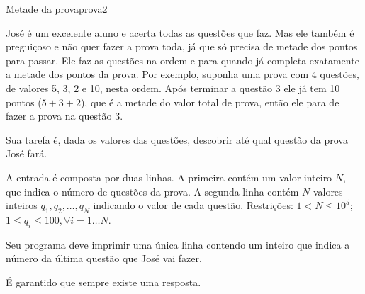 \documentclass[12pt,a4paper,oneside]{article}
\begin{document}
\begin{problem}{Metade da prova}{prova}{2}

José é um excelente aluno e acerta todas as questões que faz. Mas ele também é preguiçoso e não quer fazer a prova toda, já que só precisa de metade dos pontos para passar. Ele faz as questões na ordem e para quando já completa exatamente a metade dos pontos da prova. Por exemplo, suponha uma prova com 4 questões, de valores 5, 3, 2 e 10, nesta ordem. Após terminar a questão 3 ele já tem 10 pontos ($5+3+2$), que é a metade do valor total de prova, então ele para de fazer a prova na questão 3.

Sua tarefa é, dada os valores das questões, descobrir até qual questão da prova José fará.


%

\InputFile

A entrada é composta por duas linhas. A primeira contém um valor inteiro $N$, que indica o número de questões da prova. A segunda linha contém $N$ valores inteiros $q_1, q_2, \dots, q_N$ indicando o valor de cada questão. Restrições: $1 < N \leq 10^5$; $1 \leq q_i \leq 100, \forall i=1\dots N$.

\OutputFile

Seu programa deve imprimir uma única linha contendo um inteiro que indica a número da última questão que José vai fazer.

\Notes
É garantido que sempre existe uma resposta.

\Example

\begin{example}
%
\end{example}

\begin{example}
%
\end{example}



\end{problem}
\end{document}
